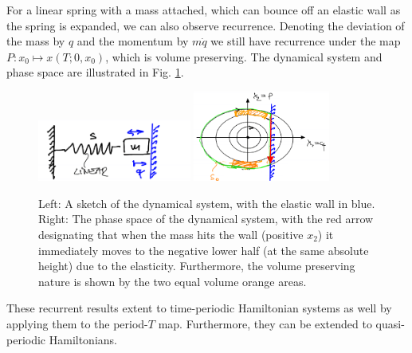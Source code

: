 \begin{ex}
	For a linear spring with a mass attached, which can bounce off an elastic wall as the spring is expanded, we can also observe recurrence. Denoting the deviation of the mass by $q$ and the momentum by $m\dot{q}$ we still have recurrence under the map $P:x_0 \mapsto x(T;0, x_0)$, which is volume preserving. The dynamical system and phase space are illustrated in Fig. \ref{fig:bouncy_wall_spring}.
	 \begin{figure}[h!]
		\centering
		\includegraphics[width=0.45\textwidth]{figures/ch8/13bouncy_wall_spring_A.png}
		\includegraphics[width=0.4\textwidth]{figures/ch8/13bouncy_wall_spring_B.png}
		\caption{Left: A sketch of the dynamical system, with the elastic wall in blue. Right: The phase space of the dynamical system, with the red arrow designating that when the mass hits the wall (positive $x_2$) it immediately moves to the negative lower half (at the same absolute height) due to the elasticity. Furthermore, the volume preserving nature is shown by the two equal volume orange areas.}
		\label{fig:bouncy_wall_spring}
	\end{figure}

	\begin{remark}[]
		These recurrent results extent to time-periodic Hamiltonian systems as well by applying them to the period-$T$ map. Furthermore, they can be extended to quasi-periodic Hamiltonians.
	\end{remark}
	
\end{ex}

